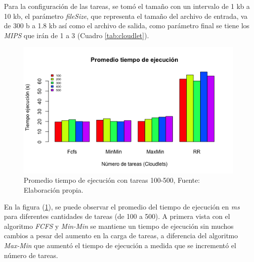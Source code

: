 Para la configuraci\'on de las tareas, se tom\'o el tamaño con un intervalo de 1 kb a 10 kb,  el par\'ametro \textit{fileSize}, que representa el tamaño del archivo de entrada, va de 300 b a 1.8 kb as\'i como el archivo de salida, como par\'ametro final se tiene los \textit{MIPS} que ir\'an de 1 a 3 (Cuadro \ref{tab:cloudlet}).



\newpage
\setcounter{figure}{14}
\renewcommand\thefigure{\arabic{figure}}
\begin{figure}[h!] 
	\centering
	\includegraphics[scale=0.5]{media/tiempoejecucion}
	\caption{Promedio tiempo de ejecuci\'on con tareas 100-500, Fuente: Elaboraci\'on propia.}
	\label{fig:tiempo}
\end{figure}



En la figura (\ref{fig:tiempo}), se puede observar el promedio del tiempo de ejecuci\'on en \emph{ms} para diferentes cantidades de tareas (de 100 a 500). A primera vista con el algoritmo \textit{FCFS} y \textit{Min-Min} se mantiene un tiempo de ejecuci\'on sin muchos cambios a pesar del aumento en la carga de tareas, a diferencia del algoritmo \textit{Max-Min} que aument\'o el tiempo de ejecuci\'on a medida que se increment\'o el n\'umero de tareas.


